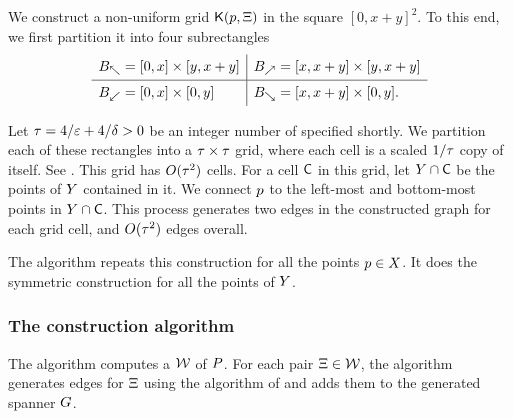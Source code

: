 \documentclass[12pt]{article}%
\begin{document}
We construct a non-uniform grid $\mathsf{K}(p, \Xi)$ in the square
$[0,x+y]^2$.  To this end, we first partition it into four
subrectangles
\begin{equation*}
    \begin{array}{l|l}
      B_\nwarrow = [0,x] \times [y,x+y]
      &
        B_\nearrow = [x,x+y] \times [y,x+y]\Bigr.\\
      \hline
      B_{\swarrow} = [0,x]\times [0,y]
      &
        B_\searrow = [x,x+y] \times [0,y].\Bigr.\\
    \end{array}
\end{equation*}

\newcommand{\gConst}{\Mh{\tau}}%

Let $\gConst = 4/\eps + 4/\delta > 0$ be an integer number of
specified shortly.  We partition each of these rectangles into a
$\gConst \times \gConst$ grid, where each cell is a scaled $1/\gConst$
copy of itself.  See . This grid has $O(\gConst^2)$
cells. For a cell $\mathsf{C}$ in this grid, let $Y \cap \mathsf{C}$ be the
points of $Y$ contained in it. We connect $p$ to the left-most
and bottom-most points in $Y \cap \mathsf{C}$. This process generates
two edges in the constructed graph for each grid cell, and
$O( \gConst^2)$ edges overall.

The algorithm repeats this construction for all the points
$p \in X$. It does the symmetric construction for all the points
of $Y$.


\subsubsection{The construction algorithm}

The algorithm computes a \QSPD $\mathcal{W}$ of $P$. For each pair
$\Xi \in \mathcal{W}$, the algorithm generates edges for $\Xi$ using the
algorithm of  and adds them to the generated
spanner $G$.
\end{document}
